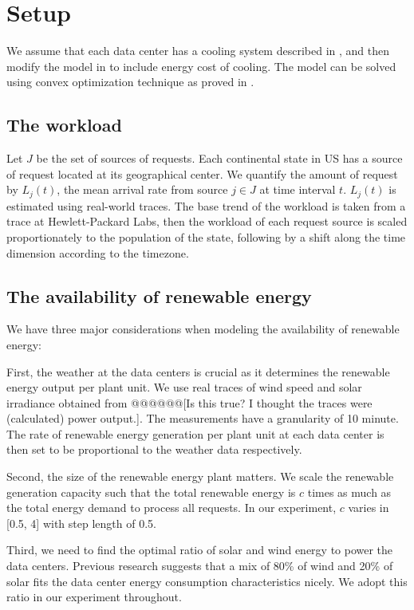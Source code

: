 \documentclass{acm_proc_article-sp}
\begin{document}
\section{Setup}
We assume that each data center has a cooling system described in \cite{adam:cooling}, and then modify the model in \cite{adam:GLB} to include energy cost of cooling. The model can be solved using convex optimization technique as proved in \cite{adam:GLBfull}.
\subsection{The workload}
Let $J$ be the set of sources of requests. Each continental state in US has a source of request located at its geographical center. We quantify the amount of request by $L_j(t)$, the mean arrival rate from source $j \in J$ at time interval $t$. $L_j(t)$ is estimated using real-world traces. The base trend of the workload is taken from a trace at Hewlett-Packard Labs, then the workload of each request source is scaled proportionately to the population of the state, following by a shift along the time dimension according to the timezone.

    
\subsection{The availability of renewable energy}
We have three major considerations when modeling the availability of renewable energy:  

First, the weather at the data centers is crucial as it determines the renewable energy output per plant unit. We use real traces of wind speed and solar irradiance obtained from \cite{renew1} \cite{renew2} @@@@@@[Is this true? I thought the traces were (calculated) power output.]. The measurements have a granularity of 10 minute. The rate of renewable energy generation per plant unit at each data center is then set to be proportional to the weather data respectively.

Second, the size of the renewable energy plant matters. We scale the renewable generation capacity such that the total renewable energy is $c$ times as much as the total energy demand to process all requests. In our experiment, $c$ varies in [0.5, 4] with step length of 0.5.  

Third, we need to find the optimal ratio of solar and wind energy to power the data centers. Previous research \cite{adam:GLB} suggests that a mix of 80\% of wind and 20\% of solar fits the data center energy consumption characteristics nicely. We adopt this ratio in our experiment throughout.
\end{document}
